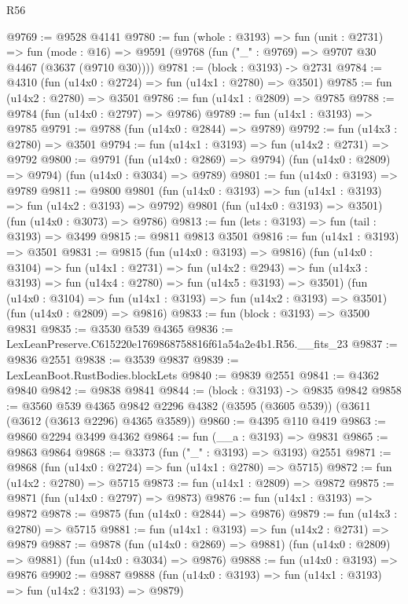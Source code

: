 \begin{lexlean}{R56}
\begin{coremodule}
@9769 := @9528 @4141
@9780 := fun (whole : @3193) =>
  fun (unit : @2731) =>
  fun (mode : @16) => @9591 (@9768 (fun ("_" : @9769) => @9707 @30 @4467 (@3637 (@9710 @30))))
@9781 := (block : @3193) -> @2731
@9784 := @4310 (fun (u14x0 : @2724) => fun (u14x1 : @2780) => @3501)
@9785 := fun (u14x2 : @2780) => @3501
@9786 := fun (u14x1 : @2809) => @9785
@9788 := @9784 (fun (u14x0 : @2797) => @9786)
@9789 := fun (u14x1 : @3193) => @9785
@9791 := @9788 (fun (u14x0 : @2844) => @9789)
@9792 := fun (u14x3 : @2780) => @3501
@9794 := fun (u14x1 : @3193) => fun (u14x2 : @2731) => @9792
@9800 := @9791
    (fun (u14x0 : @2869) => @9794)
    (fun (u14x0 : @2809) => @9794)
    (fun (u14x0 : @3034) => @9789)
@9801 := fun (u14x0 : @3193) => @9789
@9811 := @9800
    @9801
    (fun (u14x0 : @3193) => fun (u14x1 : @3193) => fun (u14x2 : @3193) => @9792)
    @9801
    (fun (u14x0 : @3193) => @3501)
    (fun (u14x0 : @3073) => @9786)
@9813 := fun (lets : @3193) => fun (tail : @3193) => @3499
@9815 := @9811 @9813 @3501
@9816 := fun (u14x1 : @3193) => @3501
@9831 := @9815
    (fun (u14x0 : @3193) => @9816)
    (fun (u14x0 : @3104) =>
    fun (u14x1 : @2731) =>
    fun (u14x2 : @2943) =>
    fun (u14x3 : @3193) => fun (u14x4 : @2780) => fun (u14x5 : @3193) => @3501)
    (fun (u14x0 : @3104) => fun (u14x1 : @3193) => fun (u14x2 : @3193) => @3501)
    (fun (u14x0 : @2809) => @9816)
@9833 := fun (block : @3193) => @3500 @9831
@9835 := @3530 @539 @4365
@9836 := LexLeanPreserve.C615220e1769868758816f61a54a2e4b1.R56.__fits_23
@9837 := @9836 @2551
@9838 := @3539 @9837
@9839 := LexLeanBoot.RustBodies.blockLets
@9840 := @9839 @2551
@9841 := @4362 @9840
@9842 := @9838 @9841
@9844 := (block : @3193) -> @9835 @9842
@9858 := @3560
    @539
    @4365
    @9842
    @2296
    @4382
    (@3595 (@3605 @539))
    (@3611 (@3612 (@3613 @2296) @4365 @3589))
@9860 := @4395 @110 @419
@9863 := @9860 @2294 @3499 @4362
@9864 := fun (__a : @3193) => @9831
@9865 := @9863 @9864
@9868 := @3373 (fun ("_" : @3193) => @3193) @2551
@9871 := @9868 (fun (u14x0 : @2724) => fun (u14x1 : @2780) => @5715)
@9872 := fun (u14x2 : @2780) => @5715
@9873 := fun (u14x1 : @2809) => @9872
@9875 := @9871 (fun (u14x0 : @2797) => @9873)
@9876 := fun (u14x1 : @3193) => @9872
@9878 := @9875 (fun (u14x0 : @2844) => @9876)
@9879 := fun (u14x3 : @2780) => @5715
@9881 := fun (u14x1 : @3193) => fun (u14x2 : @2731) => @9879
@9887 := @9878
    (fun (u14x0 : @2869) => @9881)
    (fun (u14x0 : @2809) => @9881)
    (fun (u14x0 : @3034) => @9876)
@9888 := fun (u14x0 : @3193) => @9876
@9902 := @9887
    @9888
    (fun (u14x0 : @3193) => fun (u14x1 : @3193) => fun (u14x2 : @3193) => @9879)

\end{coremodule}
\end{lexlean}

